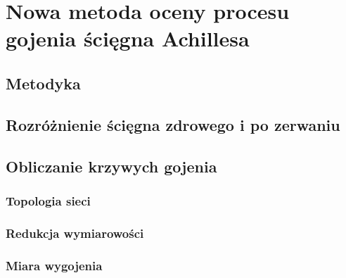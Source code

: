 \chapter{Nowa metoda oceny procesu gojenia ścięgna Achillesa}
\section{Metodyka}
\section{Rozróżnienie ścięgna zdrowego i po zerwaniu}
\section{Obliczanie krzywych gojenia}
\subsection{Topologia sieci}
\subsection{Redukcja wymiarowości}
\subsection{Miara wygojenia}